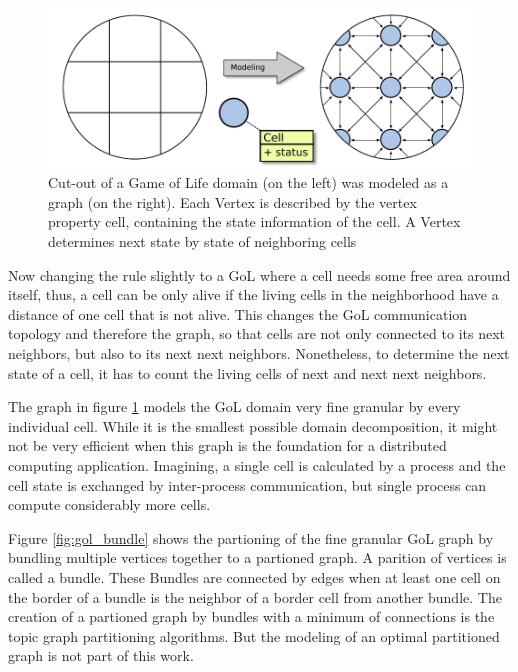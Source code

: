 \begin{figure}[H]
  \centering \includegraphics[width=\textwidth]{graphics/30_gol}
  \caption{Cut-out of a Game of Life domain (on the left) was modeled
    as a graph (on the right). Each Vertex is described by the vertex
    property cell, containing the state information of the cell. A
    Vertex determines next state by state of neighboring cells}
  \label{fig:gol}
\end{figure}


Now changing the rule slightly to a GoL where a cell needs some free
area around itself, thus, a cell can be only alive if the living cells
in the neighborhood have a distance of one cell that is not
alive. This changes the GoL communication topology and therefore the
graph, so that cells are not only connected to its next neighbors, but
also to its next next neighbors. Nonetheless, to determine the next
state of a cell, it has to count the living cells of next and next
next neighbors.


The graph in figure \ref{fig:gol} models the GoL domain very fine
granular by every individual cell. While it is the smallest possible
domain decomposition, it might not be very efficient when this graph
is the foundation for a distributed computing application. Imagining, a
single cell is calculated by a process and the cell state is exchanged
by inter-process communication, but single process can compute
considerably more cells.


Figure \ref{fig:gol_bundle} shows the partioning of the fine granular
GoL graph by bundling multiple vertices together to a partioned
graph. A parition of vertices is called a bundle. These Bundles are
connected by edges when at least one cell on the border of a bundle
is the neighbor of a border cell from another bundle.  The creation of
a partioned graph by bundles with a minimum of connections is the
topic graph partitioning algorithms. But the modeling of an optimal
partitioned graph is not part of this work.

